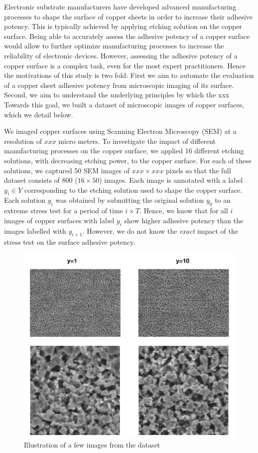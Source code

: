 \documentclass[10pt,twocolumn,letterpaper]{article}
\begin{document}
Electronic substrate manufacturers have developed advanced manufacturing processes to shape the surface of copper sheets in order to increase their adhesive potency. This is typically achieved by applying etching solution on the copper surface.
Being able to accurately assess the adhesive potency of a copper surface would allow to further optimize manufacturing processes to increase the reliability of electronic devices.
However, assessing the adhesive potency of a copper surface is a complex task, even for the most expert practitioners. 
Hence the motivations of this study is two fold: 
First we aim to automate the evaluation of a copper sheet adhesive potency from microscopic imaging of its surface. 
Second, we aim to understand the underlying principles by which the xxx 
Towards this goal, we built a dataset of microscopic images of copper surfaces, which we detail below.

We imaged copper surfaces using Scanning Electron Microscopy (SEM) at a resolution of $xxx$ micro meters.
To investigate the impact of different manufacturing processes on the copper surface, 
we applied 16 different etching solutions, with decreasing etching power, to the copper surface.
For each of these solutions, we captured 50 SEM images of $xxx \times xxx$ pixels so that the full dataset
consists of $800$ ($16 \times 50$) images.
Each image is annotated with a label $y_i \in Y$ corresponding to the etching solution used to shape the copper surface.
Each solution $y_i$ was obtained by submitting the original solution $y_0$ to an extreme stress test for a period of time $i \times T$.
Hence, we know that for all $i$ images of copper surfaces with label $y_i$ show higher adhesive potency than the images labelled with $y_{i+1}$.
However, we do not know the \textit{exact} impact of the stress test on the surface adhesive potency.

\begin{figure}[h]
	\centering
	\includegraphics[width=0.9\linewidth]{"./figures/Figure3"}
	\caption{
		Illustration of a few images from the dataset
	}
\end{figure}
\end{document}
